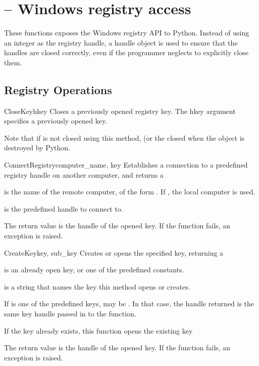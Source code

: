 \section{ --
         Windows registry access}


These functions exposes the Windows registry API to Python.  Instead of
using an integer as the registry handle, a handle object is used to ensure
that the handles are closed correctly, even if the programmer
neglects to explicitly close them.


\subsection{Registry Operations \label{registry-operations}}

\begin{funcdesc}{CloseKey}{hkey}
 Closes a previously opened registry key.
 The hkey argument specifies a previously opened key.

 Note that if  is not closed using this method, (or the
  closed when the  object is 
 destroyed by Python.
\end{funcdesc}


\begin{funcdesc}{ConnectRegistry}{computer_name, key}
  Establishes a connection to a predefined registry handle on 
  another computer, and returns a 

  is the name of the remote computer, of the 
 form .  If , the local computer is 
 used.
 
  is the predefined handle to connect to.

 The return value is the handle of the opened key.
 If the function fails, an  exception is 
 raised.
\end{funcdesc}


\begin{funcdesc}{CreateKey}{key, sub_key}
 Creates or opens the specified key, returning a 
 
  is an already open key, or one of the predefined 
  constants.
 
  is a string that names the key this method opens 
 or creates.
 
 If  is one of the predefined keys,  may 
 be . In that case, the handle returned is the same key handle 
 passed in to the function.

 If the key already exists, this function opens the existing key

 The return value is the handle of the opened key.
 If the function fails, an  exception is 
 raised.
\end{funcdesc}


